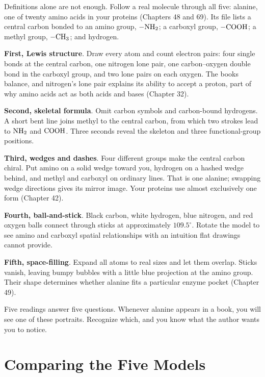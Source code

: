 Definitions alone are not enough. Follow a real molecule through all five: alanine, one of twenty amino acids in your proteins (Chapters 48 and 69). Its file lists a central carbon bonded to an amino group, $-\mathrm{NH_2}$; a carboxyl group, $-\mathrm{COOH}$; a methyl group, $-\mathrm{CH_3}$; and hydrogen.

\textbf{First, Lewis structure}. Draw every atom and count electron pairs: four single bonds at the central carbon, one nitrogen lone pair, one carbon--oxygen double bond in the carboxyl group, and two lone pairs on each oxygen. The books balance, and nitrogen's lone pair explains its ability to accept a proton, part of why amino acids act as both acids and bases (Chapter 32).

\textbf{Second, skeletal formula}. Omit carbon symbols and carbon-bound hydrogens. A short bent line joins methyl to the central carbon, from which two strokes lead to $\mathrm{NH_2}$ and $\mathrm{COOH}$. Three seconds reveal the skeleton and three functional-group positions.

\textbf{Third, wedges and dashes}. Four different groups make the central carbon chiral. Put amino on a solid wedge toward you, hydrogen on a hashed wedge behind, and methyl and carboxyl on ordinary lines. That is one alanine; swapping wedge directions gives its mirror image. Your proteins use almost exclusively one form (Chapter 42).

\textbf{Fourth, ball-and-stick}. Black carbon, white hydrogen, blue nitrogen, and red oxygen balls connect through sticks at approximately $109.5^{\circ}$. Rotate the model to see amino and carboxyl spatial relationships with an intuition flat drawings cannot provide.

\textbf{Fifth, space-filling}. Expand all atoms to real sizes and let them overlap. Sticks vanish, leaving bumpy bubbles with a little blue projection at the amino group. Their shape determines whether alanine fits a particular enzyme pocket (Chapter 49).

Five readings answer five questions. Whenever alanine appears in a book, you will see one of these portraits. Recognize which, and you know what the author wants you to notice.

\section{Comparing the Five Models}

